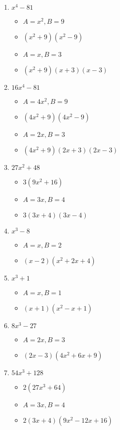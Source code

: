 \documentclass{article}
\begin{document}
\begin{enumerate}
\item $x^{4} - 81$
  \begin{itemize}
  \item $A=x^{2}, B=9$
  \item $(x^{2}+9)(x^{2}-9)$
  \item $A=x, B=3$
  \item $(x^{2}+9)(x+3)(x-3)$
  \end{itemize}
\item $16x^{4} - 81$
  \begin{itemize}
  \item $A=4x^{2}, B=9$
  \item $(4x^{2}+9)(4x^{2}-9)$
  \item $A=2x, B=3$
  \item $(4x^{2}+9)(2x+3)(2x-3)$
  \end{itemize}
\item $27x^{2} + 48$
  \begin{itemize}
  \item $3(9x^{2}+16)$
  \item $A=3x, B=4$
  \item $3(3x+4)(3x-4)$
  \end{itemize}
\item $x^{3} - 8$
  \begin{itemize}
  \item $A=x, B=2$
  \item $(x-2)(x^{2}+2x+4)$
  \end{itemize}
\item $x^{3} + 1$
  \begin{itemize}
  \item $A=x, B=1$
  \item $(x+1)(x^{2}-x+1)$
  \end{itemize}
\item $8x^{3} - 27$
  \begin{itemize}
  \item $A=2x, B=3$
  \item $(2x-3)(4x^{2}+6x+9)$
  \end{itemize}
\item $54x^{3} + 128$
  \begin{itemize}
  \item $2(27x^{3}+64)$
  \item $A=3x, B=4$
  \item $2(3x+4)(9x^{2}-12x+16)$
  \end{itemize}

\end{enumerate}
\end{document}
